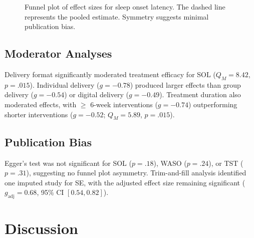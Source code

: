 \documentclass[
    language=english,
    doctype=meta-analysis,
    institution=none,
]{../../omnilatex}
\begin{document}
\begin{figure}[htbp]
    \centering
    \caption{Funnel plot of effect sizes for sleep onset latency. The dashed line
             represents the pooled estimate. Symmetry suggests minimal publication bias.}
    \label{fig:funnel}
\end{figure}

\subsection{Moderator Analyses}

Delivery format significantly moderated treatment efficacy for SOL ($Q_M = 8.42$,
$p = .015$). Individual delivery ($g = -0.78$) produced larger effects than group
delivery ($g = -0.54$) or digital delivery ($g = -0.49$). Treatment duration also
moderated effects, with $\geq$ 6-week interventions ($g = -0.74$) outperforming
shorter interventions ($g = -0.52$; $Q_M = 5.89$, $p = .015$).

\subsection{Publication Bias}

Egger's test was not significant for SOL ($p = .18$), WASO ($p = .24$), or TST
($p = .31$), suggesting no funnel plot asymmetry. Trim-and-fill analysis identified
one imputed study for SE, with the adjusted effect size remaining significant
($g_{\text{adj}} = 0.68$, 95\% CI $[0.54, 0.82]$).

\section{Discussion}
\label{sec:discussion}
\end{document}
